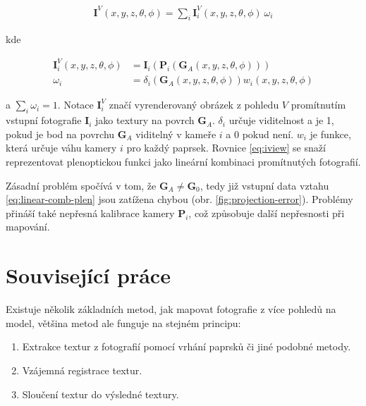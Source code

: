 \documentclass[11pt,twoside,a4paper]{book}
\begin{document}
\begin{align}
\label{eq:iview}
\textbf{I}^V(x, y, z, \theta, \phi) = \sum_{i} \textbf{I}_{i}^{V}(x, y, z, \theta, \phi)~\omega_i
\end{align}

\noindent kde

\begin{align}
\label{eq:linear-comb-plen}
\textbf{I}_{i}^{V}(x, y, z, \theta, \phi) &=\textbf{I}_{i}(\textbf{P}_{i}(\textbf{G}_A(x, y, z, \theta, \phi)))\\
\label{eq:linear-weighting}
 \omega_i &= \delta_i(\textbf{G}_A(x, y, z, \theta, \phi)) w_i(x, y, z, \theta, \phi)
\end{align}

\noindent a $\sum_i \omega_i = 1$. Notace $ \textbf{I}_{i}^{V}$ značí vyrenderovaný obrázek z pohledu $V$ promítnutím vstupní fotografie  $\textbf{I}_{i}$ jako textury na povrch  $\textbf{G}_A$. $\delta_i$ určuje viditelnost a je 1, pokud je bod na povrchu $\textbf{G}_A$ viditelný v kameře $i$ a 0 pokud není. $w_i$ je funkce, která určuje váhu kamery $i$ pro každý paprsek. Rovnice \ref{eq:iview} se snaží reprezentovat plenoptickou funkci jako lineární kombinaci promítnutých fotografií.

Zásadní problém spočívá v tom, že $\textbf{G}_A \neq \textbf{G}_0$, tedy již vstupní data vztahu \ref{eq:linear-comb-plen} jsou zatížena chybou (obr. \ref{fig:projection-error}). Problémy přináší také nepřesná kalibrace kamery $\textbf{P}_i$, což způsobuje další nepřesnosti při mapování.

\section{Související práce}
\label{sec:related}

Existuje několik základních metod, jak mapovat fotografie z více pohledů na
model, většina metod ale funguje na stejném principu:
\begin{enumerate}
\item Extrakce textur z fotografií pomocí vrhání paprsků či jiné podobné metody.
\item Vzájemná registrace textur.
\item Sloučení textur do výsledné textury.
\end{enumerate}
\end{document}
